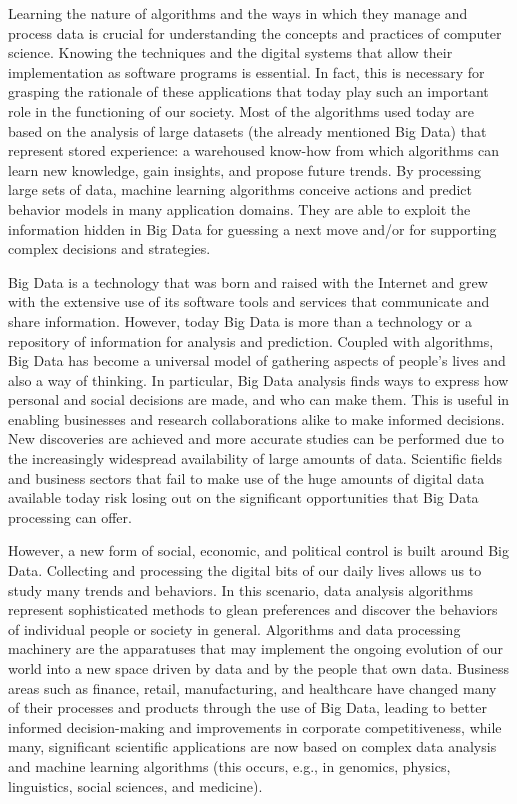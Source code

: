 Learning the nature of algorithms and the ways in which they manage and process data is crucial for understanding the concepts and practices of computer science. Knowing the techniques and the digital systems that allow their implementation as software programs is essential. In fact, this is necessary for grasping the rationale of these applications that today play such an important role in the functioning of our society. Most of the algorithms used today are based on the analysis of large datasets (the already mentioned Big Data) that represent stored experience: a warehoused know-how from which algorithms can learn new knowledge, gain insights, and propose future trends. By processing large sets of data, machine learning algorithms conceive actions and predict behavior models in many application domains. They are able to exploit the information hidden in Big Data for guessing a next move and/or for supporting complex decisions and strategies.

Big Data is a technology that was born and raised with the Internet and grew with the extensive use of its software tools and services that communicate and share information. However, today Big Data is more than a technology or a repository of information for analysis and prediction. Coupled with algorithms, Big Data has become a universal model of gathering aspects of people's lives and also a way of thinking. In particular, Big Data analysis finds ways to express how personal and social decisions are made, and who can make them. This is useful in enabling businesses and research collaborations alike to make informed decisions. New discoveries are achieved and more accurate studies can be performed due to the increasingly widespread availability of large amounts of data. Scientific fields and business sectors that fail to make use of the huge amounts of digital data available today risk losing out on the significant opportunities that Big Data processing can offer.

However, a new form of social, economic, and political control is built around Big Data. Collecting and processing the digital bits of our daily lives allows us to study many trends and behaviors. In this scenario, data analysis algorithms represent sophisticated methods to glean preferences and discover the behaviors of individual people or society in general. Algorithms and data processing machinery are the apparatuses that may implement the ongoing evolution of our world into a new space driven by data and by the people that own data. Business areas such as finance, retail, manufacturing, and healthcare have changed many of their processes and products through the use of Big Data, leading to better informed decision-making and improvements in corporate competitiveness, while many, significant scientific applications are now based on complex data analysis and machine learning algorithms (this occurs, e.g., in genomics, physics, linguistics, social sciences, and medicine).

